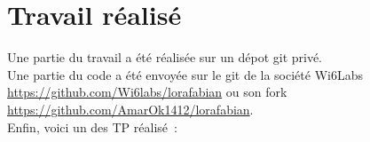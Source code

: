 \documentclass{article}
\begin{document}
	\section{Travail réalisé}
	Une partie du travail a été réalisée sur un dépot git privé.\\
	Une partie du code a été envoyée sur le git de la société Wi6Labs \url{https://github.com/Wi6labs/lorafabian} ou son fork \url{https://github.com/AmarOk1412/lorafabian}.\\
	Enfin, voici un des TP réalisé~:\\
	
\end{document}
